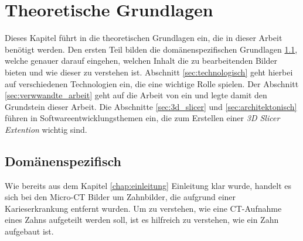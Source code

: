 \chapter{Theoretische Grundlagen}
\label{chap:theoretische_grundlagen} Dieses Kapitel führt in die theoretischen Grundlagen
ein, die in dieser Arbeit benötigt werden. Den ersten Teil bilden die domänenspezifischen
Grundlagen \ref{sec:domänenspezifisch}, welche genauer darauf eingehen, welchen Inhalt
die zu bearbeitenden Bilder bieten und wie dieser zu verstehen ist. Abschnitt
\ref{sec:technologisch} geht hierbei auf verschiedenen Technologien ein, die eine
wichtige Rolle spielen. Der Abschnitt \ref{sec:verwwandte_arbeit} geht auf die
Arbeit von \citet{hoffmann2020} ein und legte damit den Grundstein dieser Arbeit.
Die Abschnitte \ref{sec:3d_slicer} und \ref{sec:architektonisch} führen in
Softwareentwicklungsthemen ein, die zum Erstellen einer \textit{3D Slicer
Extention} wichtig sind.

\section{Domänenspezifisch}
\label{sec:domänenspezifisch} Wie bereits aus dem Kapitel \ref{chap:einleitung}
Einleitung klar wurde, handelt es sich bei den Micro-CT Bilder um Zahnbilder,
die aufgrund einer Karieserkrankung entfernt wurden. Um zu verstehen, wie eine
CT-Aufnahme eines Zahns aufgeteilt werden soll, ist es hilfreich zu verstehen,
wie ein Zahn aufgebaut ist.

